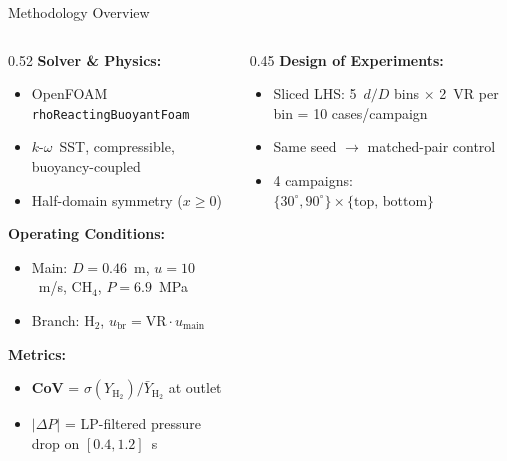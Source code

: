 \documentclass[10pt, aspectratio=169]{beamer}
\begin{document}
\begin{frame}[fragile]{Methodology Overview}
    \small
    \begin{columns}[T]
        \begin{column}{0.52\textwidth}
            \textbf{Solver \& Physics:}
            \begin{itemize}\setlength{\itemsep}{0pt}
                \item OpenFOAM \texttt{rhoReactingBuoyantFoam}
                \item $k$-$\omega$~SST, compressible, buoyancy-coupled
                \item Half-domain symmetry ($x \ge 0$)
            \end{itemize}

            \vspace{0.2em}
            \textbf{Operating Conditions:}
            \begin{itemize}\setlength{\itemsep}{0pt}
                \item Main: $D = 0.46$~m, $u = 10$~m/s,
                      CH$_4$, $P = 6.9$~MPa
                \item Branch: H$_2$,
                      $u_{\text{br}} = \text{VR} \cdot u_{\text{main}}$
            \end{itemize}

            \vspace{0.2em}
            \textbf{Metrics:}
            \begin{itemize}\setlength{\itemsep}{0pt}
                \item \textbf{CoV} = $\sigma(Y_{\text{H}_2}) / \bar{Y}_{\text{H}_2}$ at outlet
                \item \textbf{$|\Delta P|$} = LP-filtered pressure drop
                      on $[0.4, 1.2]$~s
            \end{itemize}
        \end{column}
        \begin{column}{0.45\textwidth}
            \textbf{Design of Experiments:}
            \begin{itemize}\setlength{\itemsep}{0pt}
                \item Sliced LHS: 5~$d/D$ bins $\times$ 2~VR per bin
                      = 10 cases/campaign
                \item Same seed $\to$ matched-pair control
                \item 4 campaigns: $\{30^\circ, 90^\circ\} \times
                      \{\text{top, bottom}\}$
            \end{itemize}


\end{column}
\end{columns}
\end{frame}
\end{document}
